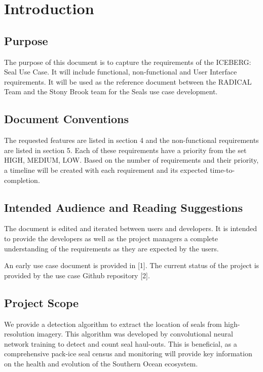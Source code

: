 \documentclass{scrreprt}
\begin{document}
\chapter{Introduction}

\section{Purpose}
The purpose of this document is to capture the requirements of the ICEBERG: Seal
Use Case. It will include functional, non-functional and User Interface requirements.
It will be used as the reference document between the RADICAL Team and the Stony 
Brook team for the Seals use case development.

\section{Document Conventions}
The requested features are listed in section 4 and the non-functional requirements are
listed in section 5. Each of these requirements have a priority from the set {HIGH,
MEDIUM, LOW}. Based on the number of requirements and their priority, a timeline
will be created with each requirement and its expected time-to-completion.

\section{Intended Audience and Reading Suggestions}

The document is edited and iterated between users and developers. It is intended
to provide the developers as well as the project managers a complete understanding 
of the requirements as they are expected by the users.

An early use case document is provided in [1]. The current status of the project 
is provided by the use case Github repository [2].

\section{Project Scope}

We provide a detection algorithm to extract the location of seals from high-resolution 
imagery. This algorithm was developed by convolutional neural network training to 
detect and count seal haul-outs. This is beneficial, as a comprehensive pack-ice 
seal census and monitoring will provide key information on the health and evolution 
of the Southern Ocean ecosystem.
\end{document}
